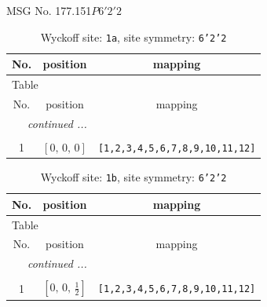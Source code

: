 \documentclass[fleqn,8pt]{jsarticle}
\begin{document}
\setcounter{MaxMatrixCols}{32}

\renewcommand{\tablename}{Table~}
\renewcommand{\figurename}{Figure~}
\begin{center}
\LARGE
MSG No. 177.151\quad$P6'2'2$
\end{center}
\renewcommand{\arraystretch}{1.2}
\begin{longtable}{ccc}
\caption{Wyckoff site: {\tt 1a}, site symmetry: {\tt 6'2'2}}
 \\
 \hline \hline
No. & position & mapping \\ \hline \endfirsthead

\multicolumn{2}{l}{\tablename\ \thetable{}} \\
 \hline \hline
No. & position & mapping \\ \hline \endhead

 \hline \hline
\multicolumn{2}{r}{\footnotesize\it continued ...} \\ \endfoot

 \hline \hline
\multicolumn{2}{r}{} \\ \endlastfoot

1 & $\left[ 0,\, 0,\, 0 \right]$ & {\tt [1,2,3,4,5,6,7,8,9,10,11,12]} \\
\end{longtable}
\renewcommand{\arraystretch}{1.2}
\begin{longtable}{ccc}
\caption{Wyckoff site: {\tt 1b}, site symmetry: {\tt 6'2'2}}
 \\
 \hline \hline
No. & position & mapping \\ \hline \endfirsthead

\multicolumn{2}{l}{\tablename\ \thetable{}} \\
 \hline \hline
No. & position & mapping \\ \hline \endhead

 \hline \hline
\multicolumn{2}{r}{\footnotesize\it continued ...} \\ \endfoot

 \hline \hline
\multicolumn{2}{r}{} \\ \endlastfoot

1 & $\left[ 0,\, 0,\, \frac{1}{2} \right]$ & {\tt [1,2,3,4,5,6,7,8,9,10,11,12]} \\
\end{longtable}
\renewcommand{\arraystretch}{1.2}
\end{document}
